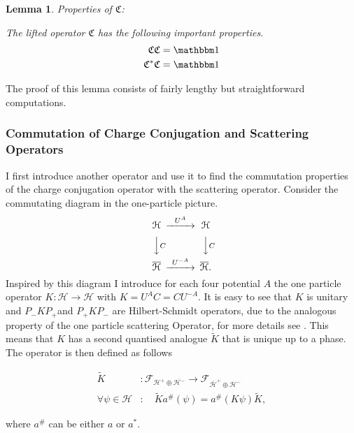 \documentclass[b5paper,draft,openbib,12pt]{memoir}
\newtheorem{lemma}{Lemma}
\newcommand{\id}{{\mathbbm 1}}
\begin{document}
\begin{lemma}\label{basic_properties}
{\large Properties of} \(\mathfrak{C}\):

The lifted operator \(\mathfrak{C}\) has the following important properties.
\begin{align}
\mathfrak{C} \mathfrak{C} = \id \label{self_invers}\\
\mathfrak{C}^* \mathfrak{C} = \id \label{unitarity}
\end{align}
\end{lemma}
The proof of this lemma consists of fairly lengthy but straightforward computations.

\subsubsection{Commutation of Charge Conjugation and Scattering Operators}
I first introduce another operator and use it to find the commutation properties of the charge conjugation operator with the scattering operator. Consider the commutating diagram in the one-particle picture.
\begin{equation}
\begin{CD}							
 \mathcal{H}     @>U^A>>  \mathcal{H}\\
@VVCV        @VVCV\\
\overline{\mathcal{H}}    @>U^{-A}>> \overline{ \mathcal{H}} .
\end{CD}
\end{equation}
Inspired by this diagram I introduce for each four potential \(A\) the one particle operator \(K: \mathcal{H}\rightarrow\mathcal{H}\) with \(K=U^AC=C U^{-A}\). It is easy to see that \(K\) is unitary and \( P_- K P_+\)and \( P_+ K P_-\) are Hilbert-Schmidt operators, due to the analogous property of the one particle scattering Operator, for more details see \cite{ivp0}. This means that \(K\) has a second quantised analogue \(\tilde{K}\) that is unique up to a phase. The operator is then defined as follows


\begin{align}
\tilde{K} &: \mathcal{F}_{\mathcal{H}^{+}\oplus \overline{\mathcal{H}^{-}}} \rightarrow  \mathcal{F}_{\overline{\mathcal{H}}^{+}\oplus \mathcal{H}^{-}}\\
\forall \psi \in \mathcal{H}&: \quad \tilde{K}a^{\#}(\psi)=a^{\#}(K\psi)\tilde{K},
\end{align}

where \(a^{\#}\) can be either \(a\) or \(a^*\).
\end{document}
